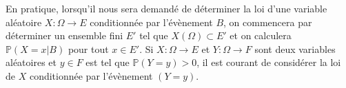 \documentclass{magnolia}
\begin{document}
\begin{remarques}
\remarque En pratique, lorsqu'il nous sera demandé de déterminer la loi d'une variable aléatoire
  $X:\Omega\to E$ conditionnée par l'évènement $B$, on commencera par déterminer un ensemble fini
  $E'$ tel que $X(\Omega)\subset E'$ et on calculera $\mathbb{P}(X=x|B)$ pour tout $x\in E'$.
\remarque Si $X:\Omega\to E$ et $Y:\Omega\to F$ sont deux variables aléatoires et $y\in F$
  est tel que $\mathbb{P}(Y=y)>0$, il est courant de considérer la loi de $X$ conditionnée
  par l'évènement $(Y=y)$.
\end{remarques}

\end{document}
